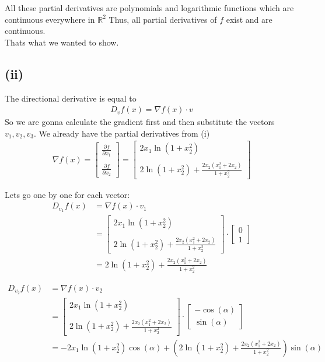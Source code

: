 \documentclass{article}
\begin{document}
All these partial derivatives are polynomials and logarithmic functions which are continuous everywhere in \( \mathbb{R}^2 \)
Thus, all partial derivatives of \(f\) exist and are continuous. \\
Thats what we wanted to show.

\subsection*{(ii)}
The directional derivative is equal to
\begin{align*}
   D_v f(x) = \nabla f(x) \cdot v
\end{align*}
So we are gonna calculate the gradient first and then substitute the vectors \(v_1, v_2, v_3\).
We already have the partial derivatives from (i)
\begin{align*}
   \nabla f(x) = \begin{bmatrix}
      \frac{\partial f}{\partial x_1} \\
      \\
      \frac{\partial f}{\partial x_2}
   \end{bmatrix} = \begin{bmatrix}
      2x_1 \ln(1 + x_2^2) \\
      \\
      2 \ln(1 + x_2^2) + \frac{2x_2 (x_1^2 + 2x_2)}{1 + x_2^2}
   \end{bmatrix}
\end{align*}

Lets go one by one for each vector:
\begin{align*}
   D_{v_1} f(x) &= \nabla f(x) \cdot v_1 \\
   &= \begin{bmatrix}
      2x_1 \ln(1 + x_2^2) \\
      \\
      2 \ln(1 + x_2^2) + \frac{2x_2 (x_1^2 + 2x_2)}{1 + x_2^2}
   \end{bmatrix} \cdot \begin{bmatrix}
      0 \\
      1
   \end{bmatrix} \\
   &= 2 \ln(1 + x_2^2) + \frac{2x_2 (x_1^2 + 2x_2)}{1 + x_2^2}
\end{align*}

\begin{align*}
   D_{v_2} f(x) &= \nabla f(x) \cdot v_2 \\
   &= \begin{bmatrix}
      2x_1 \ln(1 + x_2^2) \\
      \\
      2 \ln(1 + x_2^2) + \frac{2x_2 (x_1^2 + 2x_2)}{1 + x_2^2}
   \end{bmatrix} \cdot \begin{bmatrix}
      -\cos(\alpha) \\
      \sin(\alpha)
   \end{bmatrix} \\
   &= -2x_1 \ln(1 + x_2^2) \cos(\alpha) + \left( 2 \ln(1 + x_2^2) + \frac{2x_2 (x_1^2 + 2x_2)}{1 + x_2^2} \right) \sin(\alpha)
\end{align*}
\end{document}
